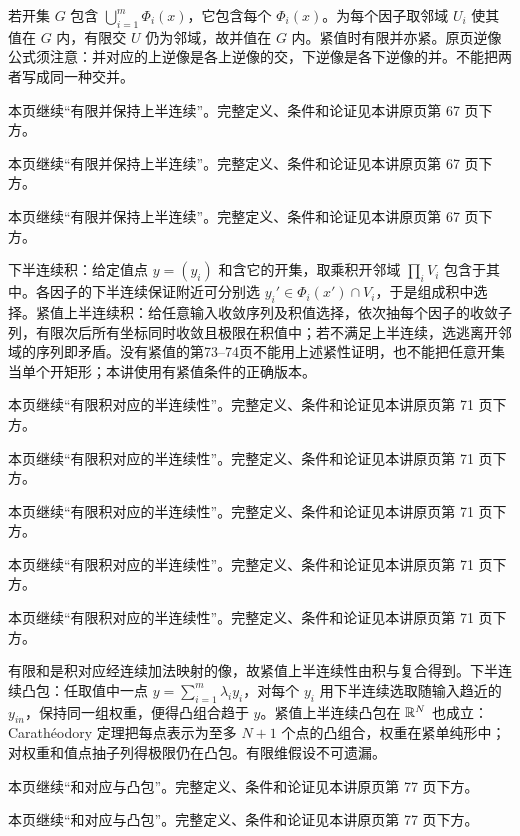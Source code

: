若开集 $G$ 包含 $\bigcup_{i=1}^m\Phi_i(x)$，它包含每个 $\Phi_i(x)$。为每个因子取邻域 $U_i$ 使其值在 $G$ 内，有限交 $U$ 仍为邻域，故并值在 $G$ 内。紧值时有限并亦紧。原页逆像公式须注意：并对应的上逆像是各上逆像的交，下逆像是各下逆像的并。不能把两者写成同一种交并。

本页继续“有限并保持上半连续”。完整定义、条件和论证见本讲原页第 67 页下方。

本页继续“有限并保持上半连续”。完整定义、条件和论证见本讲原页第 67 页下方。

本页继续“有限并保持上半连续”。完整定义、条件和论证见本讲原页第 67 页下方。

下半连续积：给定值点 $y=(y_i)$ 和含它的开集，取乘积开邻域 $\prod_iV_i$ 包含于其中。各因子的下半连续保证附近可分别选 $y_i'\in\Phi_i(x')\cap V_i$，于是组成积中选择。紧值上半连续积：给任意输入收敛序列及积值选择，依次抽每个因子的收敛子列，有限次后所有坐标同时收敛且极限在积值中；若不满足上半连续，选逃离开邻域的序列即矛盾。没有紧值的第73--74页不能用上述紧性证明，也不能把任意开集当单个开矩形；本讲使用有紧值条件的正确版本。

本页继续“有限积对应的半连续性”。完整定义、条件和论证见本讲原页第 71 页下方。

本页继续“有限积对应的半连续性”。完整定义、条件和论证见本讲原页第 71 页下方。

本页继续“有限积对应的半连续性”。完整定义、条件和论证见本讲原页第 71 页下方。

本页继续“有限积对应的半连续性”。完整定义、条件和论证见本讲原页第 71 页下方。

本页继续“有限积对应的半连续性”。完整定义、条件和论证见本讲原页第 71 页下方。

有限和是积对应经连续加法映射的像，故紧值上半连续性由积与复合得到。下半连续凸包：任取值中一点 $y=\sum_{i=1}^m\lambda_i y_i$，对每个 $y_i$ 用下半连续选取随输入趋近的 $y_{in}$，保持同一组权重，便得凸组合趋于 $y$。紧值上半连续凸包在 $\mathbb{R}^N$ 也成立：Carathéodory 定理把每点表示为至多 $N+1$ 个点的凸组合，权重在紧单纯形中；对权重和值点抽子列得极限仍在凸包。有限维假设不可遗漏。

本页继续“和对应与凸包”。完整定义、条件和论证见本讲原页第 77 页下方。

本页继续“和对应与凸包”。完整定义、条件和论证见本讲原页第 77 页下方。


